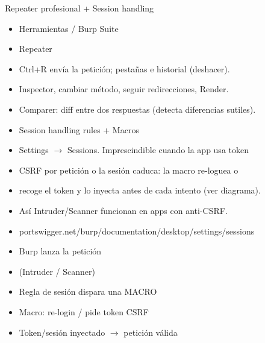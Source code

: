 \documentclass[aspectratio=169,10pt]{beamer}
\begin{document}
\begin{frame}[allowframebreaks]{Repeater profesional + Session handling}
\small
  \begin{itemize}
  \item Herramientas / Burp Suite
  \item Repeater
  \item Ctrl+R envía la petición; pestañas e historial (deshacer).
  \item Inspector, cambiar método, seguir redirecciones, Render.
  \item Comparer: diff entre dos respuestas (detecta diferencias sutiles).
  \item Session handling rules + Macros
  \item Settings $\rightarrow$ Sessions. Imprescindible cuando la app usa token
  \item CSRF por petición o la sesión caduca: la macro re-loguea o
  \item recoge el token y lo inyecta antes de cada intento (ver diagrama).
  \item Así Intruder/Scanner funcionan en apps con anti-CSRF.
  \item portswigger.net/burp/documentation/desktop/settings/sessions
  \item Burp lanza la petición
  \item (Intruder / Scanner)
  \item Regla de sesión dispara una MACRO
  \item Macro: re-login / pide token CSRF
  \item Token/sesión inyectado $\rightarrow$ petición válida
  \end{itemize}
\end{frame}
\end{document}
